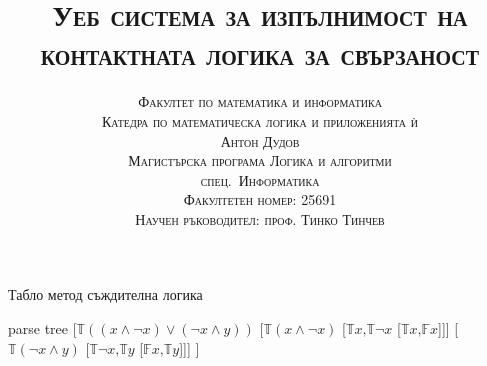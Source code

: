 \documentclass[14pt, aspectratio=169]{beamer}
\date[\today]{}
\title{\textsc{Уеб система за изпълнимост на контактната логика за свързаност}}
\author[Антон Дудов]{
	\textsc{Факултет по математика и информатика} \\
	\textsc{Катедра по математическа логика и приложенията ѝ} \\ [3mm]
	\textsc{Антон Дудов} \\ [3mm]
	\small
	\textsc{Магистърска програма Логика и алгоритми} \\
	\textsc{спец.~Информатика} \\
	\textsc{Факултетен номер: 25691} \\ [3mm]
	\small\textsc{Научен ръководител: проф. Тинко Тинчев}
}
\newcommand\ST{\mathbb{T}}
\newcommand\SF{\mathbb{F}}
\begin{document}
\begin{frame}
\titlepage
\end{frame}






\begin{frame}{Табло метод съждителна логика}
	\begin{center}
	\begin{forest}
		parse tree
		[$\ST ((x \land \neg x) \lor (\neg x \land y))$
			[$\ST (x \land \neg x)$ [$\ST x \mbox{,} \ST \neg x$ [$\ST x \mbox{,} \SF x$]]]
			[$\ST (\neg x \land y)$ [$\ST \neg  x \mbox{,} \ST y$ [$\SF x \mbox{,} \ST y$]]]
		]
	\end{forest}
	\end{center}
\end{frame}
\end{document}
